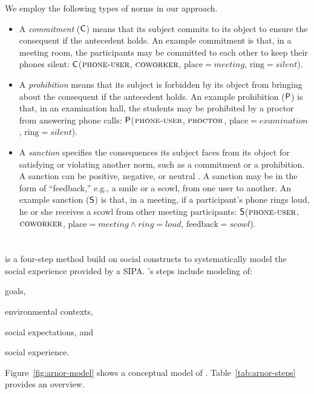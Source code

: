 We employ the following types of norms in our approach. 
\begin{itemize}

\item A \emph{commitment} ($\mathsf{C}$) means that its subject commits to its
object to ensure the consequent if the antecedent holds. An example
commitment is that, in a meeting room, the participants may be committed
to each other to keep their phones silent: $\mathsf{C}$($\textsc{phone-user}$,
$\textsc{coworker}$, $\text{place}=meeting$, $\text{ring}=silent$).

\item A \emph{prohibition} means that its subject is forbidden by its
object from bringing about the consequent if the antecedent holds. An
example prohibition ($\mathsf{P}$) is that, in an examination hall, the
students may be prohibited by a proctor from answering phone calls:
$\mathsf{P}$($\textsc{phone-user}$, $\textsc{proctor}$, $\text{place}=examination$,
$\text{ring}=silent$).

\item A \emph{sanction} specifies the consequences its subject faces
from its object for satisfying or violating another norm, such as a
commitment or a prohibition. A sanction can be positive, negative, or
neutral \citep{Nardin-KER16-Classifying}. A sanction may be in the form
of ``feedback,'' e.g., a smile or a scowl, from one user to another. An
example sanction ($\mathsf{S}$) is that, in a meeting, if a participant's
phone rings loud, he or she receives a scowl from other meeting
participants: $\mathsf{S}$($\textsc{phone-user}$, $\textsc{coworker}$,
$\text{place}=meeting \land ring=loud$, $\text{feedback}=scowl$).

\end{itemize} 

\section{\frameworkA}
\label{sec:arnor-framework}

\frameworkA is a four-step method build on social constructs to systematically model the social 
experience provided by a SIPA. \frameworkA's steps include modeling of: 
\begin{enumerate*}[label=(\arabic*)]
\item goals, 
\item environmental contexts,
\item social expectations, and 
\item social experience. 
\end{enumerate*}
Figure~\ref{fig:arnor-model} shows a conceptual model of 
\frameworkA.  Table~\ref{tab:arnor-steps} provides an overview. 


